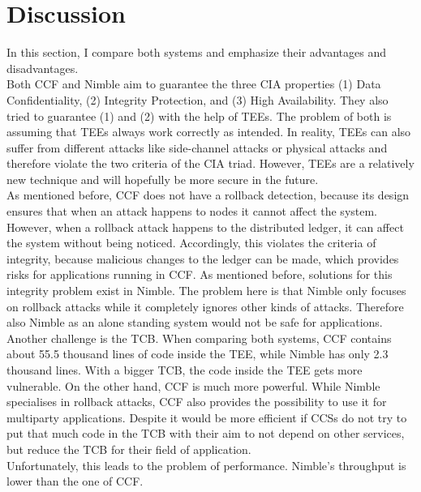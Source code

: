 \section{Discussion}
\label{challenges:ccf}
In this section, I compare both systems and emphasize their advantages and disadvantages.\\
Both CCF and Nimble aim to guarantee the three CIA properties (1) Data Confidentiality, (2) Integrity Protection, and (3) High Availability. They also tried to guarantee (1) and (2) with the help of TEEs. The problem of both is assuming that TEEs always work correctly as intended. In reality, TEEs can also suffer from different attacks like side-channel attacks or physical attacks and therefore violate the two criteria of the CIA triad. However, TEEs are a relatively new technique and will hopefully be more secure in the future.\\
As mentioned before, CCF does not have a rollback detection, because its design ensures that when an attack happens to nodes it cannot affect the system. However, when a rollback attack happens to the distributed ledger, it can affect the system without being noticed. Accordingly, this violates the criteria of integrity, because malicious changes to the ledger can be made, which provides risks for applications running in CCF.
As mentioned before, solutions for this integrity problem exist in Nimble. The problem here is that Nimble only focuses on rollback attacks while it completely ignores other kinds of attacks. Therefore also Nimble as an alone standing system would not be safe for applications.\\
Another challenge is the TCB. When comparing both systems, CCF contains about 55.5 thousand lines of code inside the TEE, while Nimble has only 2.3 thousand lines. With a bigger TCB, the code inside the TEE gets more vulnerable. On the other hand, CCF is much more powerful. While Nimble specialises in rollback attacks, CCF also provides the possibility to use it for multiparty applications.  Despite it would be more efficient if CCSs do not try to put that much code in the TCB with their aim to not depend on other services, but reduce the TCB for their field of application.\\
 Unfortunately, this leads to the problem of performance. Nimble's throughput is lower than the one of CCF. \\
  


